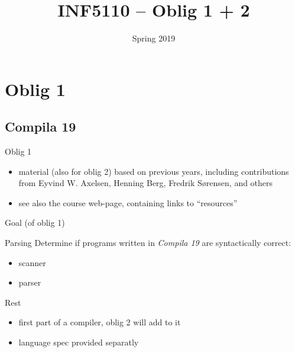 \documentclass{beamer}
\date{Spring 2019}
\title{INF5110 -- Oblig 1 + 2}
\renewcommand{\maketitle}{}
\begin{document}
\maketitle
\chapter{Oblig 1}
\label{sec:org0aa741a}



\section{Compila 19}
\label{sec:org1cf484d}

\begin{frame}[label={sec:orgdf2b956}]{Oblig 1}
\begin{itemize}
\item material (also for oblig 2) based on previous years, including contributions from Eyvind
W. Axelsen, Henning Berg, Fredrik Sørensen, and others
\end{itemize}


\begin{itemize}
\item see also the course web-page, containing links to ``resources''
\end{itemize}
\end{frame}


\begin{frame}[label={sec:org0370040}]{Goal (of oblig 1)}
\begin{block}{Parsing}
Determine if programs written in \emph{Compila 19} are syntactically correct: 

\begin{itemize}
\item scanner
\item parser
\end{itemize}
\end{block}


\begin{block}{Rest}
\begin{itemize}
\item first part of a compiler, oblig 2 will add to it
\item language spec provided separatly
\end{itemize}
\end{block}
\end{frame}
\end{document}
